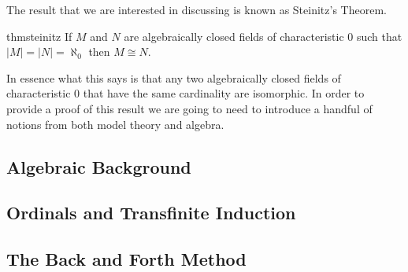 The result that we are interested in discussing is known as Steinitz's
Theorem.

\begin{restatable}{thm}{steinitz}
\label{thm:steinitz}
  If $M$ and $N$ are algebraically closed fields of characteristic 0 such that
  $|M| = |N| = \aleph_{0}$ then $M \cong N$.
\end{restatable}

In essence what this says is that any two algebraically closed fields of
characteristic 0 that have the same cardinality are isomorphic. In order to
provide a proof of this result we are going to need to introduce a handful of
notions from both model theory and algebra.

\subsection{Algebraic Background}%
\label{sec:Algebraic Background}


\subsection{Ordinals and Transfinite Induction}%
\label{sec:Ordinals and Transfinite Induction}

\newpage

\subsection{The Back and Forth Method}%
\label{sec:The Back and Forth Method}

